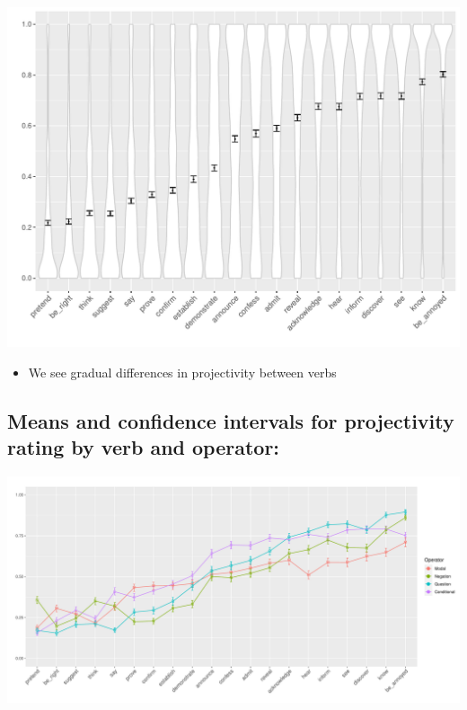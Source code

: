 \documentclass[10pt]{article}\usepackage[]{graphicx}\usepackage[dvipsnames]{xcolor}
\newenvironment{knitrout}{}{} %
\begin{document}
\begin{knitrout}
\color{fgcolor}

{\centering \includegraphics[width=\linewidth]{figures/summary-verb-1} 

}


\end{knitrout}

\begin{itemize}
  \item We see gradual differences in projectivity between verbs
\end{itemize}


\subsection{Means and confidence intervals for projectivity rating by verb and operator:}
\begin{knitrout}
\color{fgcolor}

{\centering \includegraphics[width=\linewidth]{figures/summary-combined-1} 

}


\end{knitrout}
\end{document}
